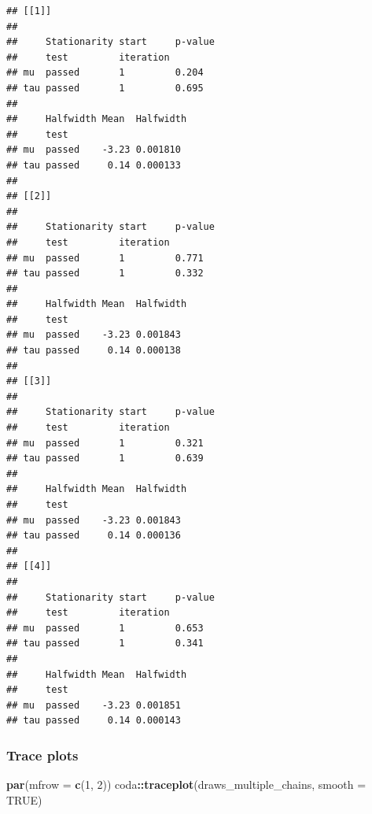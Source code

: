 \documentclass[
  11pt,
]{article}
\newenvironment{Shaded}{\begin{snugshade}}{\end{snugshade}}
\newcommand{\AttributeTok}[1]{\textcolor[rgb]{0.13,0.29,0.53}{#1}}
\newcommand{\ConstantTok}[1]{\textcolor[rgb]{0.56,0.35,0.01}{#1}}
\newcommand{\DecValTok}[1]{\textcolor[rgb]{0.00,0.00,0.81}{#1}}
\newcommand{\FunctionTok}[1]{\textcolor[rgb]{0.13,0.29,0.53}{\textbf{#1}}}
\newcommand{\NormalTok}[1]{#1}
\newcommand{\SpecialCharTok}[1]{\textcolor[rgb]{0.81,0.36,0.00}{\textbf{#1}}}
\begin{document}
\begin{verbatim}
## [[1]]
##                                   
##     Stationarity start     p-value
##     test         iteration        
## mu  passed       1         0.204  
## tau passed       1         0.695  
##                              
##     Halfwidth Mean  Halfwidth
##     test                     
## mu  passed    -3.23 0.001810 
## tau passed     0.14 0.000133 
## 
## [[2]]
##                                   
##     Stationarity start     p-value
##     test         iteration        
## mu  passed       1         0.771  
## tau passed       1         0.332  
##                              
##     Halfwidth Mean  Halfwidth
##     test                     
## mu  passed    -3.23 0.001843 
## tau passed     0.14 0.000138 
## 
## [[3]]
##                                   
##     Stationarity start     p-value
##     test         iteration        
## mu  passed       1         0.321  
## tau passed       1         0.639  
##                              
##     Halfwidth Mean  Halfwidth
##     test                     
## mu  passed    -3.23 0.001843 
## tau passed     0.14 0.000136 
## 
## [[4]]
##                                   
##     Stationarity start     p-value
##     test         iteration        
## mu  passed       1         0.653  
## tau passed       1         0.341  
##                              
##     Halfwidth Mean  Halfwidth
##     test                     
## mu  passed    -3.23 0.001851 
## tau passed     0.14 0.000143
\end{verbatim}

\hypertarget{trace-plots}{%
\subsubsection{Trace plots}\label{trace-plots}}

\begin{Shaded}
\begin{Highlighting}[]
\FunctionTok{par}\NormalTok{(}\AttributeTok{mfrow =} \FunctionTok{c}\NormalTok{(}\DecValTok{1}\NormalTok{, }\DecValTok{2}\NormalTok{))}
\NormalTok{coda}\SpecialCharTok{::}\FunctionTok{traceplot}\NormalTok{(draws\_multiple\_chains, }\AttributeTok{smooth =} \ConstantTok{TRUE}\NormalTok{)}
\end{Highlighting}
\end{Shaded}
\end{document}
